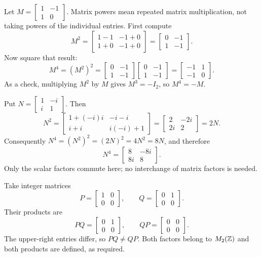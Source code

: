Let $M=\begin{bmatrix}1&-1\\1&0\end{bmatrix}$. Matrix powers mean repeated
matrix multiplication, not taking powers of the individual entries.
First compute
\[
M^2=\begin{bmatrix}1-1&-1+0\\1+0&-1+0\end{bmatrix}
=\begin{bmatrix}0&-1\\1&-1\end{bmatrix}.
\]
Now square that result:
\[
M^4=(M^2)^2
=\begin{bmatrix}0&-1\\1&-1\end{bmatrix}
 \begin{bmatrix}0&-1\\1&-1\end{bmatrix}
=\boxed{\begin{bmatrix}-1&1\\-1&0\end{bmatrix}}.
\]
As a check, multiplying $M^2$ by $M$ gives $M^3=-I_2$, so $M^4=-M$.

Put $N=\begin{bmatrix}1&-i\\i&1\end{bmatrix}$. Then
\[
N^2=\begin{bmatrix}1+(-i)i&-i-i\\i+i&i(-i)+1\end{bmatrix}
=\begin{bmatrix}2&-2i\\2i&2\end{bmatrix}=2N.
\]
Consequently $N^4=(N^2)^2=(2N)^2=4N^2=8N$, and therefore
\[
\boxed{N^4=\begin{bmatrix}8&-8i\\8i&8\end{bmatrix}}.
\]
Only the scalar factors commute here; no interchange of matrix factors is needed.

Take integer matrices
\[
P=\begin{bmatrix}1&0\\0&0\end{bmatrix},\qquad
Q=\begin{bmatrix}0&1\\0&0\end{bmatrix}.
\]
Their products are
\[
PQ=\begin{bmatrix}0&1\\0&0\end{bmatrix},\qquad
QP=\begin{bmatrix}0&0\\0&0\end{bmatrix}.
\]
The upper-right entries differ, so $PQ\ne QP$. Both factors belong to
$M_2(\mathbb{Z})$ and both products are defined, as required.

